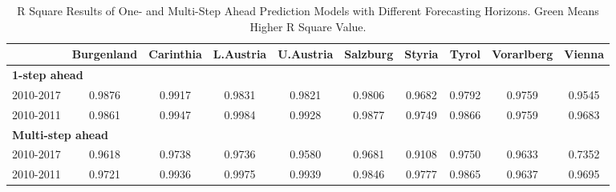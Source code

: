 \documentclass[a4paper,reqno,]{article}
\begin{document}
\begin{enumerate}
\begin{table}[H]
  \centering
  \small
    \begin{tabular}{cccccccccc}
    \toprule
    & Burgenland & Carinthia & L.Austria & U.Austria & Salzburg & Styria & Tyrol & Vorarlberg & Vienna \\
    \midrule
    \multicolumn{2}{l}{\textbf{1-step ahead}} &       &       &       &       &       &       &       &  \\
    2010-2017 & \cellcolor[rgb]{ .388,  .745,  .482}0.9876 & \cellcolor[rgb]{ .988,  .988,  1}0.9917 & \cellcolor[rgb]{ .988,  .988,  1}0.9831 & \cellcolor[rgb]{ .988,  .988,  1}0.9821 & \cellcolor[rgb]{ .988,  .988,  1}0.9806 & \cellcolor[rgb]{ .988,  .988,  1}0.9682 & \cellcolor[rgb]{ .988,  .988,  1}0.9792 & \cellcolor[rgb]{ .388,  .745,  .482}0.9759 & \cellcolor[rgb]{ .988,  .988,  1}0.9545 \\
    2010-2011 & \cellcolor[rgb]{ .988,  .988,  1}0.9861 & \cellcolor[rgb]{ .388,  .745,  .482}0.9947 & \cellcolor[rgb]{ .388,  .745,  .482}0.9984 & \cellcolor[rgb]{ .388,  .745,  .482}0.9928 & \cellcolor[rgb]{ .388,  .745,  .482}0.9877 & \cellcolor[rgb]{ .388,  .745,  .482}0.9749 & \cellcolor[rgb]{ .388,  .745,  .482}0.9866 & \cellcolor[rgb]{ .988,  .988,  1}0.9759 & \cellcolor[rgb]{ .388,  .745,  .482}0.9683 \\
    \midrule
    \multicolumn{2}{l}{\textbf{Multi-step ahead}} &       &       &       &       &       &       &       &  \\
    2010-2017 & \cellcolor[rgb]{ .988,  .988,  1}0.9618 & \cellcolor[rgb]{ .988,  .988,  1}0.9738 & \cellcolor[rgb]{ .988,  .988,  1}0.9736 & \cellcolor[rgb]{ .988,  .988,  1}0.9580 & \cellcolor[rgb]{ .988,  .988,  1}0.9681 & \cellcolor[rgb]{ .988,  .988,  1}0.9108 & \cellcolor[rgb]{ .988,  .988,  1}0.9750 & \cellcolor[rgb]{ .988,  .988,  1}0.9633 & \cellcolor[rgb]{ .988,  .988,  1}0.7352 \\
   2010-2011 & \cellcolor[rgb]{ .388,  .745,  .482}0.9721 & \cellcolor[rgb]{ .388,  .745,  .482}0.9936 & \cellcolor[rgb]{ .388,  .745,  .482}0.9975 & \cellcolor[rgb]{ .388,  .745,  .482}0.9939 & \cellcolor[rgb]{ .388,  .745,  .482}0.9846 & \cellcolor[rgb]{ .388,  .745,  .482}0.9777 & \cellcolor[rgb]{ .388,  .745,  .482}0.9865 & \cellcolor[rgb]{ .388,  .745,  .482}0.9637 & \cellcolor[rgb]{ .388,  .745,  .482}0.9695 \\
  \bottomrule
  \end{tabular}%
  \caption{R Square Results of One- and Multi-Step Ahead Prediction Models with Different Forecasting Horizons. Green Means Higher R Square Value.}
  \label{tab:ann_nstep_result}%
\end{table}%
\end{enumerate}
\end{document}
